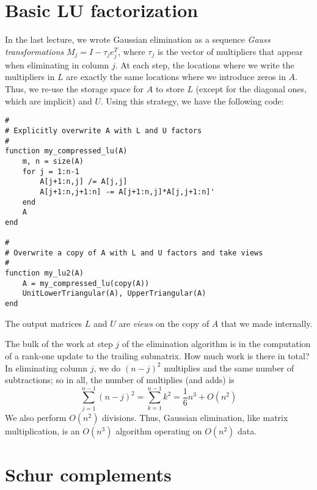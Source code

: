 \documentclass[12pt, leqno]{article}
\begin{document}

\section{Basic LU factorization}

In the last lecture, we wrote Gaussian elimination as a sequence
{\em Gauss transformations} $M_j = I - \tau_j e_j^T$, where $\tau_j$ is
the vector of multipliers that appear when eliminating in column $j$.
At each step, the locations where we
write the multipliers in $L$ are exactly the same locations where we
introduce zeros in $A$.  Thus, we re-use the storage space for $A$
to store $L$ (except for the diagonal ones, which are implicit) and
$U$.  Using this strategy, we have the following code:
\begin{lstlisting}
#
# Explicitly overwrite A with L and U factors
#
function my_compressed_lu(A)
    m, n = size(A)
    for j = 1:n-1
        A[j+1:n,j] /= A[j,j]
        A[j+1:n,j+1:n] -= A[j+1:n,j]*A[j,j+1:n]'
    end
    A
end    

#
# Overwrite a copy of A with L and U factors and take views
#
function my_lu2(A)
    A = my_compressed_lu(copy(A))
    UnitLowerTriangular(A), UpperTriangular(A)
end
\end{lstlisting}
The output matrices $L$ and $U$ are {\em views} on the copy of $A$
that we made internally.

The bulk of the work at step $j$ of the elimination algorithm is in
the computation of a rank-one update to the trailing submatrix.
How much work is there in total?  In eliminating column $j$, we do
$(n-j)^2$ multiplies and the same number of subtractions; so in all,
the number of multiplies (and adds) is
\[
  \sum_{j=1}^{n-1} (n-j)^2 = \sum_{k=1}^{n-1} k^2 = \frac{1}{6} n^3 + O(n^2)
\]
We also perform $O(n^2)$ divisions.  Thus, Gaussian elimination, like
matrix multiplication, is an $O(n^3)$ algorithm operating on $O(n^2)$ data.

\section{Schur complements}
\end{document}
